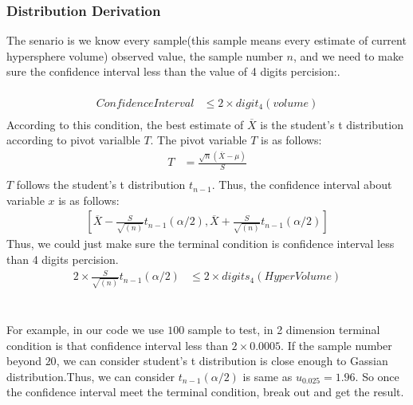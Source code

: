 \documentclass{article}
\begin{document}
		\subsubsection*{Distribution Derivation}
		The senario is we know every sample(this sample means every estimate of current hypersphere volume) observed value, the sample number $n$, and we need to make sure the confidence interval less than the value of 4 digits percision:. 
		\\
		\\
		\begin{equation*}
		\begin{split}
		 	ConfidenceInterval &\leq 2 \times digit_4(volume)\\
		\end{split}
		\end{equation*}
		According to this condition, the best estimate of $\overline{X}$ is the student's t distribution according to pivot varialble $T$. The pivot variable $T$ is as follows:
		\begin{equation*}
		\begin{split}
			T &= \frac{\sqrt{n}(\overline{X} - \mu)}{S}\\
		\end{split}
		\end{equation*}
		$T$ follows the student's t distribution $t_{n-1}$. Thus, the confidence interval about variable $x$ is as follows:
		\begin{equation*}
		\begin{split}
			[\overline{X} - \frac{S}{\sqrt{(n)}}t_{n-1}(\alpha/2), \overline{X} + \frac{S}{\sqrt{(n)}}t_{n-1}(\alpha/2)]
		\end{split}
		\end{equation*}
		Thus, we could just make sure the terminal condition is confidence interval less than 4 digits percision. 
		\begin{equation*}
		\begin{split}
			2 \times \frac{S}{\sqrt{(n)}}t_{n-1}(\alpha/2) &\leq 2 \times digits_4(HyperVolume)
		\end{split}
		\end{equation*}
		\\
		\\
		For example, in our code we use $100$ sample to test, in 2 dimension terminal condition is that confidence interval less than $2 \times 0.0005$. If the sample number beyond $20$, we can consider student's t distribution is close enough to Gassian distribution.Thus, we can consider $t_{n-1}(\alpha/2)$ is same as $u_{0.025}=1.96$. So once the confidence interval meet the terminal condition, break out and get the result.
		\\
		\\
\end{document}

